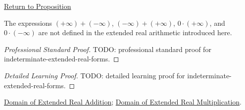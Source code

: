 \newpage
{}
\label{prf:indeterminate-extended-real-forms}
\begin{remark*}[Return]
\hyperref[prop:indeterminate-extended-real-forms]{Return to Proposition}
\end{remark*}
\begin{proposition*}
The expressions $(+\infty)+(-\infty)$, $(-\infty)+(+\infty)$,
$0\cdot(+\infty)$, and $0\cdot(-\infty)$ are not defined in the extended real
arithmetic introduced here.
\end{proposition*}
\begin{proof}[Professional Standard Proof]
\LRAProofBodyStart
TODO: professional standard proof for indeterminate-extended-real-forms.
\end{proof}
\begin{proof}[Detailed Learning Proof]
\LRAProofBodyStart
TODO: detailed learning proof for indeterminate-extended-real-forms.
\end{proof}
\begin{remark*}
\end{remark*}
\begin{dependencies}
\hyperref[def:extended-real-addition-domain]{Domain of Extended Real Addition};
\hyperref[def:extended-real-multiplication-domain]{Domain of Extended Real Multiplication}.
\end{dependencies}
\clearpage
